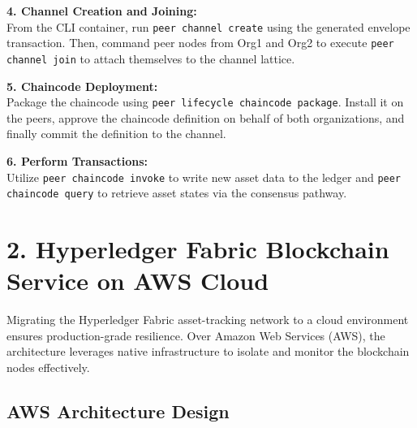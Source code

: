 \documentclass[12pt,a4paper]{article}
\begin{document}
\textbf{4. Channel Creation and Joining:}\\
From the CLI container, run \texttt{peer channel create} using the generated envelope transaction. Then, command peer nodes from Org1 and Org2 to execute \texttt{peer channel join} to attach themselves to the channel lattice.

\textbf{5. Chaincode Deployment:}\\
Package the chaincode using \texttt{peer lifecycle chaincode package}. Install it on the peers, approve the chaincode definition on behalf of both organizations, and finally commit the definition to the channel.

\textbf{6. Perform Transactions:}\\
Utilize \texttt{peer chaincode invoke} to write new asset data to the ledger and \texttt{peer chaincode query} to retrieve asset states via the consensus pathway.

\section{2. Hyperledger Fabric Blockchain Service on AWS Cloud}

Migrating the Hyperledger Fabric asset-tracking network to a cloud environment ensures production-grade resilience. Over Amazon Web Services (AWS), the architecture leverages native infrastructure to isolate and monitor the blockchain nodes effectively.

\subsection{AWS Architecture Design}
\end{document}
